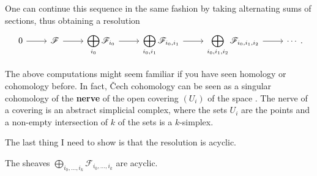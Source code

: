 One can continue this sequence in the same fashion by taking alternating
sums of sections, thus obtaining a resolution
\[\begin{tikzcd}
    0\rar & \mathscr{F}\rar
    & \displaystyle\bigoplus_{i_{0}}\mathscr{F}_{i_{0}}\rar
    & \displaystyle\bigoplus_{i_{0},i_{1}}\mathscr{F}_{i_{0},i_{1}}\rar
    & \displaystyle\bigoplus_{i_{0},i_{1},i_{2}}\mathscr{F}_{i_{0},i_{1},i_{2}}
    \rar & \cdots
  \end{tikzcd}.\]
\begin{rem}
  The above computations might seem familiar if you have seen homology
  or cohomology before. In fact, \v Cech cohomology can be seen as a singular
  cohomology of the \textbf{nerve} of the open covering $(U_{i})$ of the space
  \cite{hatcher}. The nerve of a covering is an abstract simplicial complex, where the
  sets $U_{i}$ are the points and a non-empty intersection of $k$ of the sets
  is a $k$-simplex.
\end{rem}
The last thing I need to show is that the resolution is acyclic.
\begin{lemm}
  The sheaves
  $\displaystyle\bigoplus_{i_{0},\ldots,i_{k}}\mathscr{F}_{i_{0},\ldots,i_{k}}$
  are acyclic.
\end{lemm}
